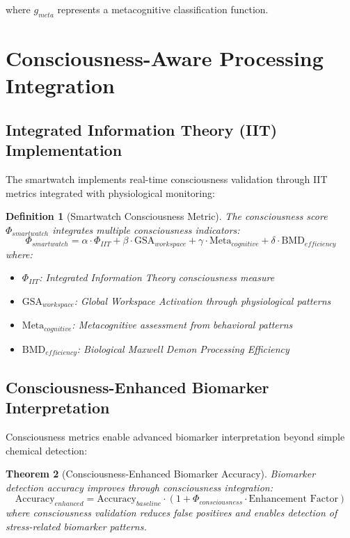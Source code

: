 \documentclass[12pt,a4paper]{article}
\newtheorem{theorem}{Theorem}[section]
\newtheorem{definition}[theorem]{Definition}
\begin{document}
where $g_{meta}$ represents a metacognitive classification function.

\section{Consciousness-Aware Processing Integration}

\subsection{Integrated Information Theory (IIT) Implementation}

The smartwatch implements real-time consciousness validation through IIT metrics integrated with physiological monitoring:

\begin{definition}[Smartwatch Consciousness Metric]
The consciousness score $\Phi_{smartwatch}$ integrates multiple consciousness indicators:
\begin{equation}
\Phi_{smartwatch} = \alpha \cdot \Phi_{IIT} + \beta \cdot \text{GSA}_{workspace} + \gamma \cdot \text{Meta}_{cognitive} + \delta \cdot \text{BMD}_{efficiency}
\end{equation}
where:
\begin{itemize}
\item $\Phi_{IIT}$: Integrated Information Theory consciousness measure
\item $\text{GSA}_{workspace}$: Global Workspace Activation through physiological patterns
\item $\text{Meta}_{cognitive}$: Metacognitive assessment from behavioral patterns
\item $\text{BMD}_{efficiency}$: Biological Maxwell Demon Processing Efficiency
\end{itemize}
\end{definition}

\subsection{Consciousness-Enhanced Biomarker Interpretation}

Consciousness metrics enable advanced biomarker interpretation beyond simple chemical detection:

\begin{theorem}[Consciousness-Enhanced Biomarker Accuracy]
Biomarker detection accuracy improves through consciousness integration:
\begin{equation}
\text{Accuracy}_{enhanced} = \text{Accuracy}_{baseline} \cdot (1 + \Phi_{consciousness} \cdot \text{Enhancement Factor})
\end{equation}
where consciousness validation reduces false positives and enables detection of stress-related biomarker patterns.
\end{theorem}
\end{document}
